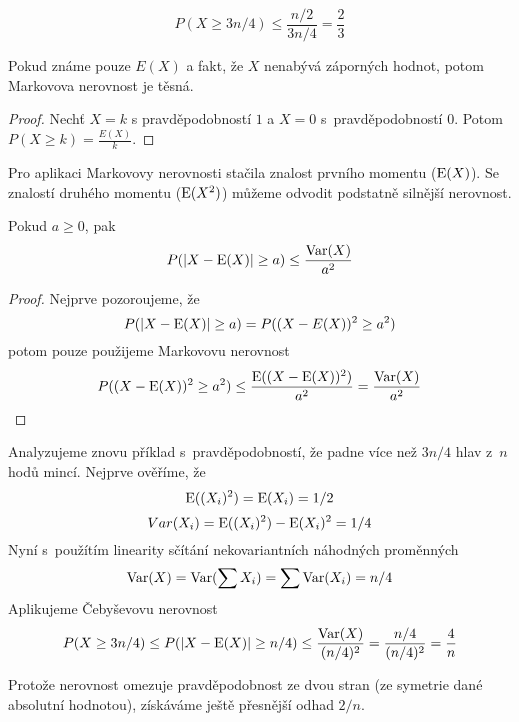 {\begin{example}
    \[
        P(X \geq 3n/4) \leq \frac{n/2}{3n/4} = \frac{2}{3}
    \]
\end{example}

\begin{theorem}
    Pokud známe pouze $E(X)$ a fakt, že $X$ nenabývá záporných hodnot,
    potom Markovova nerovnost je těsná.
\end{theorem}

\begin{proof}
    Nechť $X = k$ s pravděpodobností $1$
    a $X = 0$ s~pravděpodobností $0$.
    Potom $P(X \geq k) = \frac{E(X)}{k}$.
\end{proof}

Pro aplikaci Markovovy nerovnosti stačila znalost prvního momentu
($\operatorname{E}(X)$). Se znalostí druhého momentu ($\operatorname{E}(X^2)$) můžeme
odvodit podstatně silnější nerovnost.

\begin{theorem}
    Pokud $a \geq 0$, pak
    \[
        P(\lvert X - \operatorname{E}(X) \rvert \geq a) \leq \frac{\operatorname{Var}(X)}{a^2}
    \]
\end{theorem}

\begin{proof}
    Nejprve pozoroujeme, že
    \[
        P(\lvert X - \operatorname{E}(X) \rvert \geq a)
        = P((X - E(X))^2 \geq a^2)
\]
    potom pouze použijeme Markovovu nerovnost
    \[
        P((X - \operatorname{E}(X))^2 \geq a^2)
        \leq \frac{\operatorname{E}((X - \operatorname{E}(X))^2)}{a^2}
        = \frac{\operatorname{Var}(X)}{a^2}
        \qedhere
    \]
\end{proof}

\begin{example}
    Analyzujeme znovu příklad s~pravděpodobností, že padne více než
    $3n/4$ hlav z~$n$ hodů mincí. Nejprve ověříme, že
    \[
        \operatorname{E}((X_i)^2) = \operatorname{E}(X_i) = 1/2
    \]\[
        Var(X_i) = \operatorname{E}((X_i)^2) - \operatorname{E}(X_i)^2 = 1/4
    \]
    Nyní s~použítím linearity sčítání nekovariantních náhodných
    proměnných
    \[
        \operatorname{Var}(X) = \operatorname{Var}(\sum X_i) = \sum \operatorname{Var}(X_i) = n/4
    \]
    Aplikujeme Čebyševovu nerovnost
    \[
        P(X \geq 3n/4 ) \leq P(\lvert X - \operatorname{E}(X) \rvert \geq n/4)
                     \leq \frac{\operatorname{Var}(X)}{(n/4)^2}
                     = \frac{n/4}{(n/4)^2}
                    = \frac{4}{n}
    \]

    Protože nerovnost omezuje pravděpodobnost ze dvou stran (ze symetrie
    dané absolutní hodnotou), získáváme ještě přesnější odhad $2/n$.
\end{example}

}
